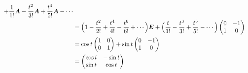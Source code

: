 \begin{ans*}
\begin{enumerate}[label=(\arabic*)]
\begin{align}
      + \frac{1}{1!}\bm{A} - \frac{t^2}{3!}\bm{A} + \frac{t^4}{5!}\bm{A} - \cdots \\
      &=
      \Bigl(1 - \frac{t^2}{2!} + \frac{t^4}{4!} - \frac{t^6}{6!} + \cdots \Bigr)\bm{E} 
      + \Bigl(\frac{t}{1!} - \frac{t^3}{3!} + \frac{t^5}{5!} - \cdots \Bigr)
      \begin{pmatrix}
        0 & -1 \\
        1 & 0
      \end{pmatrix} \\
      &=
      \cos t
      \begin{pmatrix}
        1 & 0 \\
        0 & 1 
      \end{pmatrix}
      +
      \sin t
      \begin{pmatrix}
        0 & -1 \\
        1 & 0 
      \end{pmatrix} \\
      &=
      \begin{pmatrix}
        \cos t & -\sin t \\
        \sin t & \cos t 
      \end{pmatrix}
    \end{align}
    
  \end{enumerate}
  
\end{ans*}

